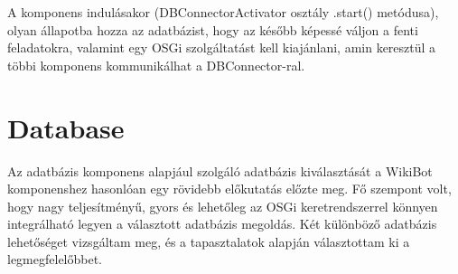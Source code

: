 A komponens indulásakor (DBConnectorActivator osztály .start() metódusa), olyan állapotba hozza az adatbázist, hogy az később képessé váljon a fenti feladatokra, valamint egy OSGi szolgáltatást kell kiajánlani, amin keresztül a többi komponens kommunikálhat a DBConnector-ral.


\section{Database}
\label{sec:db}

Az adatbázis komponens alapjául szolgáló adatbázis kiválasztását a WikiBot komponenshez hasonlóan egy rövidebb előkutatás előzte meg. Fő szempont volt, hogy nagy teljesítményű, gyors és lehetőleg az OSGi keretrendszerrel könnyen integrálható legyen a választott adatbázis megoldás. Két különböző adatbázis lehetőséget vizsgáltam meg, és a tapasztalatok alapján választottam ki a legmegfelelőbbet.

